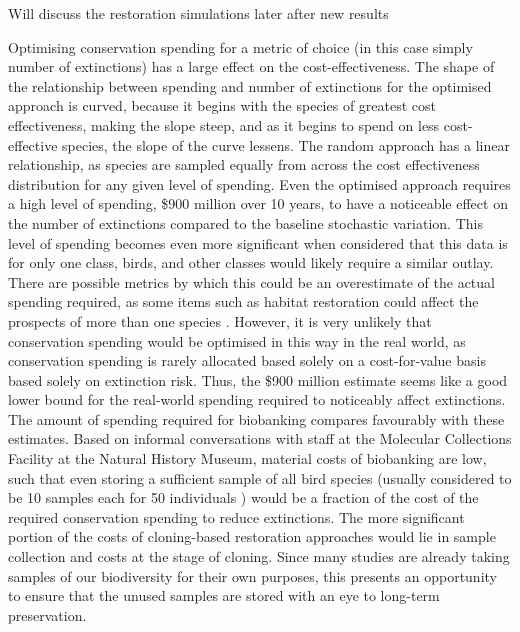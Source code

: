 \documentclass[12pt]{article}
\begin{document}
	Will discuss the restoration simulations later after new results
	
	Optimising conservation spending for a metric of choice
	(in this case simply number of extinctions)
	has a large effect on the cost-effectiveness. The shape
	of the relationship between spending and number of extinctions for the optimised
	approach is curved, because it begins with the species of greatest
	cost effectiveness, making the slope steep, and as it begins to spend on
	less cost-effective species, the slope of the curve lessens. The random approach
	has a linear relationship, as species are sampled equally
	from across the cost effectiveness distribution for any given level of spending.
	Even the optimised approach requires a high level of spending,
	\$900 million over 10 years, to have a noticeable
	effect on the number of extinctions compared to the baseline stochastic variation.
	This level of spending becomes even more significant when considered that
	this data is for only one class, birds, and other classes would likely require
	a similar outlay. There are possible metrics by which this
	could be an overestimate of the actual spending required, as some
	items such as habitat restoration could affect the prospects
	of more than one species
	\citep{mccarthyFinancialCostsMeeting2012}. However, it is very unlikely that
	conservation spending would be optimised in this way in the real world, as
	conservation spending is rarely allocated based solely on a cost-for-value basis
	based solely on extinction risk. Thus, the \$900 million estimate
	seems like a good lower bound for the real-world spending required
	to noticeably affect extinctions.
	The amount of spending required for biobanking compares
	favourably with these estimates. Based on informal conversations with staff at the
	Molecular Collections Facility at the Natural History Museum, material costs
	of biobanking are low, such that even storing a sufficient sample of all bird
	species (usually considered to be 10 samples each for 50 individuals
	\citep{harwoodDevelopingImplementingPrioritisation2021}) would be
	a fraction of the cost of the required conservation spending to reduce
	extinctions. The more significant portion of the costs of cloning-based
	restoration approaches would lie in sample collection and costs at the
	stage of cloning. Since many studies are already taking samples of our
	biodiversity for their own purposes, this presents an opportunity to ensure
	that the unused samples are stored with an eye to long-term
	preservation.
	
\end{document}
